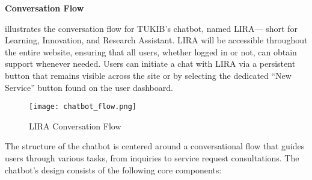 \newpage

\noindent \textbf{Conversation Flow}

 illustrates the conversation flow for TUKIB's chatbot, named LIRA— short for Learning, Innovation, and Research Assistant. LIRA will be accessible throughout the entire website, ensuring that all users, whether logged in or not, can obtain support whenever needed. Users can initiate a chat with LIRA via a persistent button that remains visible across the site or by selecting the dedicated “New Service” button found on the user dashboard.

\begin{figure}[h]
	\centering 
	\texttt{[image: chatbot\_flow.png]}
	\caption{LIRA Conversation Flow}
	\label{fig:chatbot_flow}
\end{figure}

The structure of the chatbot is centered around a conversational flow that guides users through various tasks, from inquiries to service request consultations. The chatbot’s design consists of the following core components:

